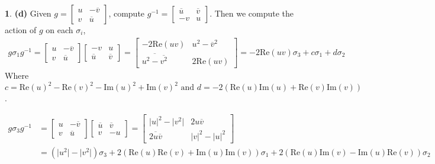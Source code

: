 \documentclass[10.5pt]{article}
\theoremstyle{definition}
\newtheorem{pb}{}
\newcommand{\abs}[1]{\lvert#1\rvert}
\newcommand{\tand}{\text{ and }}
\begin{document}
\begin{pb}
        \textbf{(d)} Given \(g = \begin{bmatrix} u & -\overline{v} \\ v & \overline{u} \end{bmatrix}\), compute \(g^{-1} = \begin{bmatrix} \overline{u} & \overline{v} \\ -v & u \end{bmatrix}\).
        Then we compute the action of \(g\) on each \(\sigma_i\),
        \begin{align*}
            g \sigma_1 g^{-1} = \begin{bmatrix} u & -\overline{v} \\ v & \overline{u} \end{bmatrix}\begin{bmatrix} -v & u \\ \overline{u} & \overline{v} \end{bmatrix} = 
            \begin{bmatrix} -2\text{Re}(uv) & u^2 - \overline{v}^2 \\ \overline{u^2 - \overline{v^2}} & 2\text{Re}(uv) \end{bmatrix} = -2\text{Re}(uv) \sigma_3 + c \sigma_1 + d \sigma_2
        \end{align*}
        Where \(c = \text{Re}(u)^2 - \text{Re}(v)^2 - \text{Im}(u)^2 + \text{Im}(v)^2 \tand d = -2(\text{Re}(u)\text{Im}(u) + \text{Re}(v)\text{Im}(v))\).

        \begin{align*}
            g \sigma_3 g^{-1} &= \begin{bmatrix} u & -\overline{v} \\ v & \overline{u} \end{bmatrix}\begin{bmatrix} \overline{u} & \overline{v} \\ v & -u \end{bmatrix} = 
            \begin{bmatrix} \abs{u}^2 - \abs{v^2} & 2u \overline{v} \\ \overline{2u \overline{v}} & \abs{v}^2 - \abs{u}^2 \end{bmatrix} \\
            &= (\abs{u^2} - \abs{v^2})\sigma_3 + 2(\text{Re}(u)\text{Re}(v) + \text{Im}(u)\text{Im}(v))\sigma_1 + 2(\text{Re}(u)\text{Im}(v) - \text{Im}(u)\text{Re}(v))\sigma_2
        \end{align*}


\end{pb}
\end{document}
